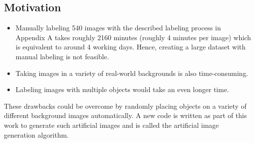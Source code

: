 \subsection{Motivation}
	\begin{itemize}
		\item Manually labeling 540 images with the described labeling process in Appendix A takes roughly 2160 minutes (roughly 4 minutes per image) which is equivalent to around 4 working days. Hence, creating a large dataset with manual labeling is not feasible.
		\item Taking images in a variety of real-world backgrounds is also time-consuming.
		\item Labeling images with multiple objects would take an even longer time.
	\end{itemize}
	
These drawbacks could be overcome by randomly placing objects on a variety of different background images automatically. A new code is written as part of this work to generate such artificial images and is called the artificial image generation algorithm.

